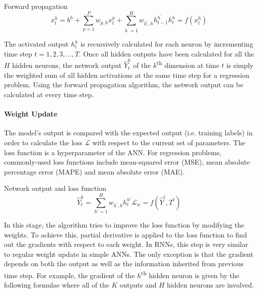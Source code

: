 \documentclass[11pt]{article} %
\theoremstyle{plain}
\theoremstyle{definition}
\begin{document}
Forward propagation
\begin{subequations} 
	\begin{equation}
	\label{forward_prop_weighted_sum}
	x^h_t=b^h+\sum_{p=1}^{P}w_{p,h}x^p_t+\sum_{h^\prime=1}^{H}w_{h^\prime,h}h_{t-1}^{h^\prime}
	\end{equation}
	\begin{equation}
	\label{forward_prop_activation}
	h_t^h=f(x_t^h)
	\end{equation}
\label{forward_prop}
\end{subequations}

The activated output \(h^h_t\) is recursively calculated for each neuron by incrementing time step \(t=1,2,3,...,T\). Once all hidden outputs have been calculated for all the \(H\) hidden neurons, the network output \(\hat{Y}_t^k\) of the \(k\)\textsuperscript{th} dimension at time \(t\) is simply the weighted sum of all hidden activations at the same time step for a regression problem. Using the forward propagation algorithm, the network output can be calculated at every time step.


\paragraph{Weight Update} 
The model's output is compared with the expected output (i.e. training labels) in order to calculate the loss \(\mathcal{L}\) with respect to the current set of parameters. The loss function  is a hyperparameter of the ANN. For regression problems, commonly-used loss functions include mean-squared error (MSE), mean absolute percentage error (MAPE) and mean absolute error (MAE).

Network output and loss function
\begin{subequations} 
	\begin{equation}
	\label{dense_output}
	\hat{Y}^k_t=\sum_{h\prime=1}^{H}w_{h^\prime,k}h^{h\prime}_t
	\end{equation}
	\begin{equation}
	\label{loss_function}
	\mathcal{L}_w=f(\hat{Y}^t,T^t)
	\end{equation}
\end{subequations}

In this stage, the algorithm tries to improve the loss function by modifying the weights. To achieve this, partial derivative is applied to the loss function to find out the gradients with respect to each weight. In RNNs, this step is very similar to regular weight update in simple ANNs. The only exception is that the gradient depends on both the output as well as the information inherited from previous time step. For example, the gradient of the \(h\)\textsuperscript{th} hidden neuron is given by the following formulae where all of the \(K\) outputs and \(H\) hidden neurons are involved.
\end{document}
